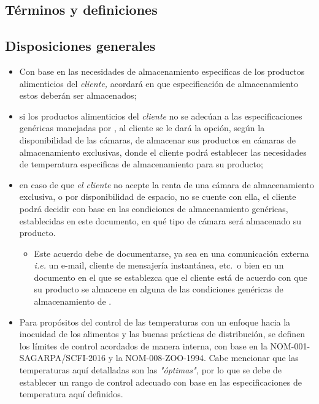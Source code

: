 \subsection{Términos y definiciones}

\begin{description}
\end{description}

\subsection{Disposiciones generales}

\begin{itemize}
	\item Con base en las necesidades de almacenamiento especificas de los productos alimenticios del \emph{cliente,}  acordará en que especificación de almacenamiento estos deberán ser almacenados;
	\item si los productos alimenticios del \emph{cliente} no se adecúan a las especificaciones genéricas manejadas por , al cliente se le dará la opción, según la disponibilidad de las cámaras, de almacenar sus productos en cámaras de almacenamiento exclusivas, donde el cliente podrá establecer las necesidades de temperatura especificas de almacenamiento para su producto;
	\item en caso de que \emph{el cliente} no acepte la renta de una cámara de almacenamiento exclusiva, o por disponibilidad de espacio, no se cuente con ella, el cliente podrá decidir con base en las condiciones de almacenamiento genéricas, establecidas en este documento, en qué tipo de cámara será almacenado su producto.
	\begin{itemize}
		\item Este acuerdo debe de documentarse, ya sea en una comunicación externa \emph{i.e.} un e-mail, cliente de mensajería instantánea, etc.\ o bien en un documento en el que se establezca que el cliente está de acuerdo con que su producto se almacene en alguna de las condiciones genéricas de almacenamiento de .
	\end{itemize}
	\item Para propósitos del control de las temperaturas con un enfoque hacia la inocuidad de los alimentos y las buenas prácticas de distribución, se definen los límites de control acordados de manera interna, con base en la NOM-001-SAGARPA/SCFI-2016 y la NOM-008-ZOO-1994. Cabe mencionar que las temperaturas aquí detalladas son las \emph{"óptimas",} por lo que se debe de establecer un rango de control adecuado con base en las especificaciones de temperatura aquí definidos.
\end{itemize}

